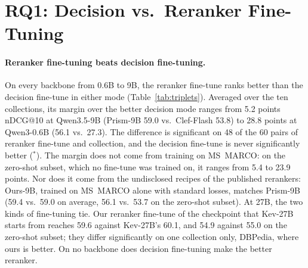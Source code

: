 \section{RQ1: Decision vs.\ Reranker Fine-Tuning}
\label{sec:reranking}



\paragraph{Reranker fine-tuning beats decision fine-tuning.}
On every backbone from 0.6B to 9B, the reranker fine-tune ranks better than the decision fine-tune in either mode
(Table~\ref{tab:triplets}). Averaged over the ten collections, its margin over the better decision mode ranges from
5.2 points nDCG@10 at Qwen3.5-9B (Prism-9B 59.0 vs.\ Clef-Flash 53.8) to 28.8 points at Qwen3-0.6B (56.1 vs.\ 27.3).
The difference is significant on 48 of the 60 pairs of reranker fine-tune and collection, and the decision fine-tune
is never significantly better (${}^\ast$). The margin does not come from training on MS~MARCO: on the zero-shot
subset, which no fine-tune was trained on, it ranges from 5.4 to 23.9 points. Nor does it come from the undisclosed
recipes of the published rerankers: Ours-9B, trained on MS~MARCO alone with standard losses, matches Prism-9B (59.4
vs.\ 59.0 on average, 56.1 vs.\ 53.7 on the zero-shot subset). At 27B, the two kinds of fine-tuning tie. Our reranker
fine-tune of the checkpoint that Kev-27B starts from reaches 59.6 against Kev-27B's 60.1, and 54.9 against 55.0 on
the zero-shot subset; they differ significantly on one collection only, DBPedia, where ours is better. On no backbone
does decision fine-tuning make the better reranker.

